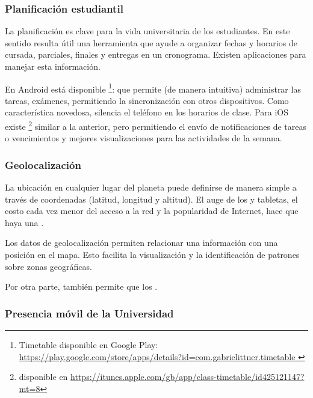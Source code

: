 \subsubsection{Planificación estudiantil}
\label{aplicaciones_utiles_existentes_planificacion}

La planificación es clave para la vida universitaria de los estudiantes. En este sentido resulta útil una herramienta que ayude a organizar fechas y horarios
de cursada, parciales, finales y entregas en un cronograma. Existen 
aplicaciones para manejar esta información.

En Android está disponible \footnote{Timetable disponible en Google Play: \url{https://play.google.com/store/apps/details?id=com.gabrielittner.timetable } }:
que permite (de manera intuitiva) administrar las tareas, exámenes, permitiendo la sincronización con otros dispositivos. Como característica novedosa, silencia el teléfono en los horarios de clase.
Para iOS existe \footnote{ disponible en \url{https://itunes.apple.com/gb/app/class-timetable/id425121147?mt=8} } similar a la anterior, pero permitiendo el envío de notificaciones de tareas o vencimientos y mejores visualizaciones para las actividades de la semana.

\subsubsection{Geolocalización}
\label{aplicaciones_utiles_existentes_localizacion}

La ubicación en cualquier lugar del planeta puede definirse de manera simple a través de coordenadas (latitud, longitud y altitud). El auge de los  y tabletas, el costo cada vez menor del acceso a la red y la popularidad de Internet, hace que haya una \cite{durall2012perspectivas}.

Los datos de geolocalización permiten relacionar una información con una posición en el mapa. Esto facilita la visualización y la identificación de patrones sobre zonas geográficas.

Por otra parte, también permite que los \cite{durall2012perspectivas}.


\subsubsection{Presencia móvil de la Universidad}
\label{aplicaciones_utiles_existentes_presencia}

